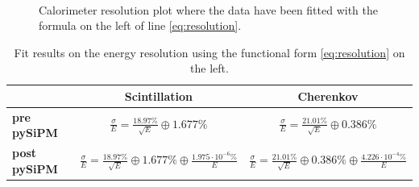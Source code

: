 \begin{figure}
	\centering
	 \\
	\caption{Calorimeter resolution plot where the data have been fitted with the formula on the left of line \ref{eq:resolution}.}
	\label{fig:sigma_su_e}
\end{figure}

\begin{table}
	\centering
	\begin{tabular}{lcc}
		\toprule
		& \textbf{Scintillation} & \textbf{Cherenkov} \\
		\midrule
		\textbf{pre pySiPM} &	$\frac{\sigma}{E} = \frac{18.97\%}{\sqrt{E}} \oplus 1.677\%$ 	& $\frac{\sigma}{E} = \frac{21.01\%}{\sqrt{E}} \oplus 0.386\%$ \\
		\textbf{post pySiPM} & $\frac{\sigma}{E} = \frac{18.97\%}{\sqrt{E}} \oplus 1.677\% \oplus \frac{1.975\cdot 10^{-6}\%}{E}$ 	& $\frac{\sigma}{E} = \frac{21.01\%}{\sqrt{E}} \oplus 0.386\% \oplus \frac{4.226\cdot 10^{-4}\%}{E}$ \\
		\bottomrule
	\end{tabular}
	\caption{Fit results on the energy resolution using the functional form \ref{eq:resolution} on the left.}
	\label{tab:res_regular_sum}
\end{table}

